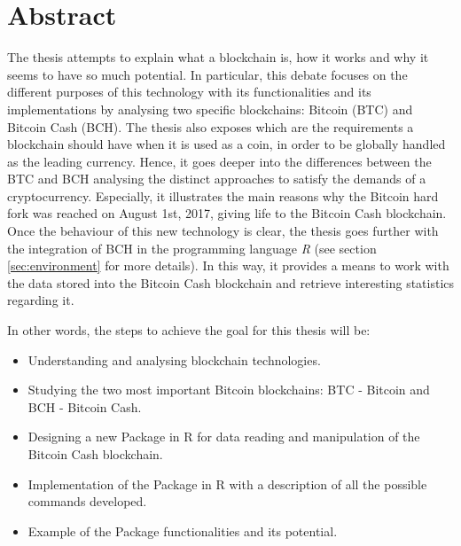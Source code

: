 \chapter*{Abstract} %
\label{abstract}


The thesis attempts to explain what a blockchain is, 
how it works and why it seems to have so much potential. 
In particular, this debate focuses on the different purposes of this
technology with its functionalities and its implementations by 
analysing two specific blockchains: Bitcoin (BTC)\cite{bitcoin.org} and Bitcoin Cash (BCH)\cite{bitcoincash}. 
The thesis also exposes which are the requirements 
a blockchain should have when it is used as a coin, in order to be 
globally handled as the leading currency. Hence, it goes deeper into the
differences between the BTC and BCH analysing the distinct approaches to 
satisfy the demands of a cryptocurrency. Especially, it illustrates
the main reasons why the Bitcoin hard fork was reached on August 1st, 
2017, giving life to the Bitcoin Cash blockchain.
Once the behaviour of this new technology is clear, the thesis goes 
further with the integration of BCH in the programming language \textit{R} (see section \ref{sec:environment} for more details).
In this way, it provides a means to work with the data stored into the Bitcoin
Cash blockchain and retrieve interesting statistics regarding it.

  In other words, the steps to achieve the goal for this thesis will be:



\begin{itemize}
  \item Understanding and analysing blockchain technologies.
  \item Studying the two most important Bitcoin blockchains: BTC - Bitcoin and BCH - Bitcoin Cash.
  \item Designing a new Package in R for data reading and manipulation of the Bitcoin Cash blockchain.
  \item Implementation of the Package in R with a description of all the possible commands developed.
  \item Example of the Package functionalities and its potential.
\end{itemize}




